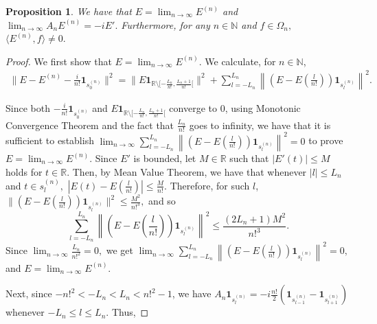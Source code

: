 \documentclass{amsart}
\newtheorem{prop}[thm]{Proposition}
\theoremstyle{definition}
\theoremstyle{remark}
\def \LL{\langle}
\def \RR{\rangle}
\begin{document}
\begin{prop}\label{proposition_gaussian_finite}
	We have that $E=\lim_{n\rightarrow\infty}E^{(n)}$ and  $\lim_{n\rightarrow\infty}A_n E^{(n)}=-iE'.$ Furthermore, for any $n\in\mathbb{N}$ and $f\in\Omega_n,$ $\LL E^{(n)}, f\RR\neq 0.$ 
\end{prop}
\begin{proof}
	We first show that $E=\lim_{n\rightarrow\infty} E^{(n)}.$ We calculate, for $n\in\mathbb{N}$,
	\begin{align*}
		\|E-E^{(n)}-\frac{i}{n!}\mathbf{1}_{s_0^{(n)}}\|^2=\|E\mathbf{1}_{\mathbb{R}\setminus[-\frac{L_n}{n!},\frac{L_n+1}{n!}[}\|^2+\sum_{l=-L_n}^{L_n}\left\|\left(E-E\left(\frac{l}{n!}\right)\right)\mathbf{1}_{s_l^{(n)}}\right\|^2.
	\end{align*}
	
	Since both $-\frac{i}{n!}\mathbf{1}_{s_0^{(n)}}$ and $E\mathbf{1}_{\mathbb{R}\setminus[-\frac{L_n}{n!},\frac{L_n+1}{n!}[}$ converge to $0$, using Monotonic Convergence Theorem and the fact that $\frac{L_n}{n!}$ goes to infinity, we have that it is sufficient to establish $\lim_{n\rightarrow\infty}\sum_{l=-L_n}^{L_n}\left\|\left(E-E\left(\frac{l}{n!}\right)\right)\mathbf{1}_{s_l^{(n)}}\right\|^2=0$ to prove $E=\lim_{n\rightarrow\infty} E^{(n)}.$ Since $E'$ is bounded, let $M\in\mathbb{R}$ such that $|E'(t)|\leq M$ holds for $t\in\mathbb{R}.$ Then, by Mean Value Theorem, we have that whenever $|l|\leq L_n$ and $t\in s_l^{(n)}, $ $|E(t)-E(\frac{l}{n!})|\leq \frac{M}{n!}.$ Therefore, for such $l$, $\|\left(E-E\left(\frac{l}{n!}\right)\right)\mathbf{1}_{s_l^{(n)}} \|^2\leq \frac{M^2}{n!^3},$ and so $$\sum_{l=-L_n}^{L_n}\left\|\left(E-E\left(\frac{l}{n!}\right)\right)\mathbf{1}_{s_l^{(n)}}\right\|^2\leq\frac{(2L_n+1)M^2}{n!^3}. $$ Since $\lim_{n\rightarrow\infty}\frac{L_n}{n!^2}=0,$ we get $\lim_{n\rightarrow\infty}\sum_{l=-L_n}^{L_n}\left\|\left(E-E\left(\frac{l}{n!}\right)\right)\mathbf{1}_{s_l^{(n)}}\right\|^2=0,$ and $E=\lim_{n\rightarrow\infty}E^{(n)}.$
	
	Next, since $-n!^2<-L_n<L_n<n!^2-1$, we have $A_n\mathbf{1}_{s_l^{(n)}}=-i\frac{n!}{2}(\mathbf{1}_{s_{l-1}^{(n)}}-\mathbf{1}_{s_{l+1}^{(n)}})$ whenever $-L_n\leq l\leq L_n.$ Thus, 
	

\end{proof}
\end{document}

